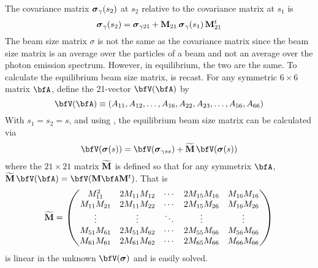 The covariance matrix ${\boldsymbol{\sigma}}_\gamma(s_2)$ at $s_2$ relative to the covariance matrix at $s_1$ is
\begin{equation}
  {\boldsymbol{\sigma}}_\gamma(s_2) = {\boldsymbol{\sigma}}_{\gamma21} + {\bf M}_{21} \, {\boldsymbol{\sigma}}_\gamma(s_1) \, {\bf M}_{21}^t
  \label{ssmsm}
\end{equation}
The beam size matrix $\sigma$ is not the same as the covariance matrix since the beam size matrix is
an average over the particles of a beam and not an average over the photon emission
spectrum. However, in equilibrium, the two are the same. To calculate the equilibrium beam size
matrix,  is recast. For any symmetric $6\times6$ matrix $\bfA$, define the 21-vector
$\bfV(\bfA)$ by
\begin{equation}
  \bfV(\bfA) \equiv (A_{11}, A_{12}, \ldots, A_{16}, A_{22}, A_{23}, \ldots, A_{56}, A_{66})
\end{equation}
With $s_1 = s_2 = s$, and using , the equilibrium beam size matrix can be calculated via
\begin{equation}
  \bfV(\bfsig(s)) = \bfV(\bfsig_{\gamma ss}) + \wt\bfM \, \bfV(\bfsig(s))
  \label{vsmv}
\end{equation}
where the $21\times21$ matrix $\widetilde{{\bf M}}$ is defined so that for any symmetrix $\bfA$, $\wt\bfM \, \bfV(\bfA) =
\bfV(\bfM\bfA\bfM^t)$. That is
\begin{equation}
  \widetilde{{\bf M}} = \begin{pmatrix}
    M_{11}^2      & 2 M_{11} M_{12} & \cdots & 2 M_{15} M_{16} & M_{16} M_{16} \\
    M_{11} M_{21} & 2 M_{11} M_{22} & \cdots & 2 M_{15} M_{26} & M_{16} M_{26} \\
    \vdots        & \vdots          & \ddots & \vdots          & \vdots      \\
    M_{51} M_{61} & 2 M_{51} M_{62} & \cdots & 2 M_{55} M_{66} & M_{56} M_{66} \\
    M_{61} M_{61} & 2 M_{61} M_{62} & \cdots & 2 M_{65} M_{66} & M_{66} M_{66}
  \end{pmatrix}
\end{equation}
 is linear in the unknown $\bfV(\bfsig)$ and is easily solved.

